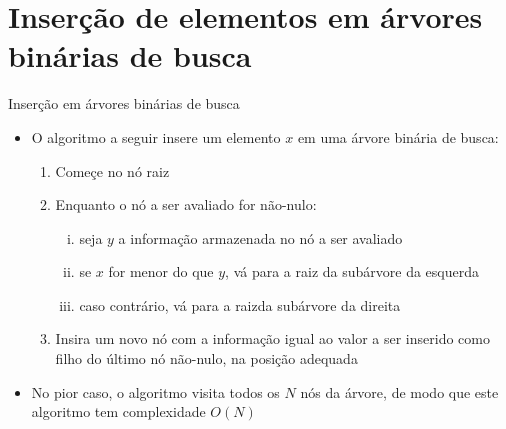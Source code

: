 \section{Inserção de elementos em árvores binárias de busca}

\begin{frame}[fragile]{Inserção em árvores binárias de busca}
    \begin{itemize}
	    \item O algoritmo a seguir insere um elemento $x$ em uma árvore binária de busca:

	\begin{enumerate}
		\item Começe no nó raiz

		\item Enquanto o nó a ser avaliado for não-nulo:

		\begin{enumerate}[i.]
            \item seja $y$ a informação armazenada no nó a ser avaliado

            \item se $x$ for menor do que $y$, vá para a raiz da subárvore da esquerda

            \item caso contrário, vá para a raizda subárvore da direita
		\end{enumerate}

		\item Insira um novo nó com a informação igual ao valor a ser inserido como { filho} do último nó não-nulo, na posição adequada
	\end{enumerate}

        \item No pior caso, o algoritmo visita todos os $N$ nós da árvore, de modo que este algoritmo tem complexidade $O(N)$
    \end{itemize}
\end{frame} 

